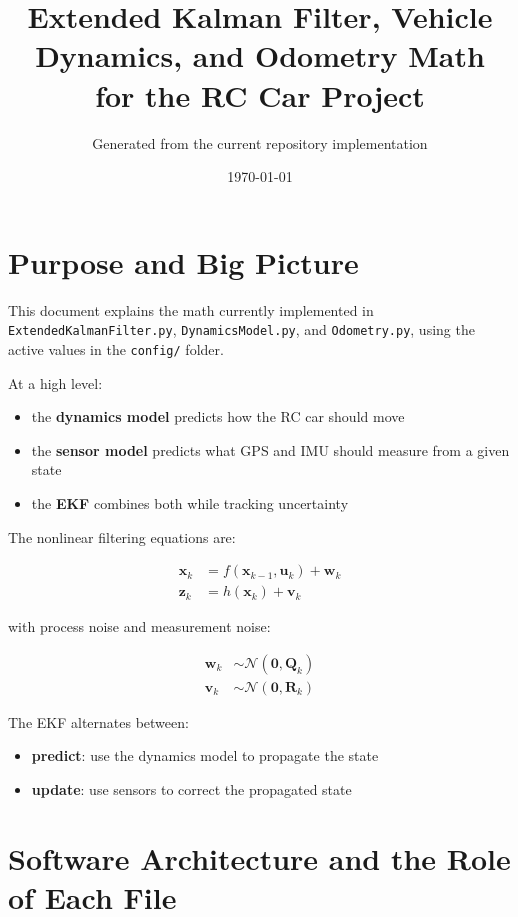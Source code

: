 \documentclass[11pt]{article}
\title{Extended Kalman Filter, Vehicle Dynamics, and Odometry Math\\for the RC Car Project}
\author{Generated from the current repository implementation}
\date{\today}
\newcommand{\vect}[1]{\boldsymbol{#1}}
\newcommand{\mat}[1]{\mathbf{#1}}
\begin{document}
\maketitle
\tableofcontents
\newpage

\section{Purpose and Big Picture}

This document explains the math currently implemented in \texttt{ExtendedKalmanFilter.py}, \texttt{DynamicsModel.py}, and \texttt{Odometry.py}, using the active values in the \texttt{config/} folder.

At a high level:

\begin{itemize}
    \item the \textbf{dynamics model} predicts how the RC car should move
    \item the \textbf{sensor model} predicts what GPS and IMU should measure from a given state
    \item the \textbf{EKF} combines both while tracking uncertainty
\end{itemize}

The nonlinear filtering equations are:

\begin{align}
\vect{x}_k &= f(\vect{x}_{k-1}, \vect{u}_k) + \vect{w}_k \\
\vect{z}_k &= h(\vect{x}_k) + \vect{v}_k
\end{align}

with process noise and measurement noise:

\begin{align}
\vect{w}_k &\sim \mathcal{N}(\vect{0}, \mat{Q}_k) \\
\vect{v}_k &\sim \mathcal{N}(\vect{0}, \mat{R}_k)
\end{align}

The EKF alternates between:

\begin{itemize}
    \item \textbf{predict}: use the dynamics model to propagate the state
    \item \textbf{update}: use sensors to correct the propagated state
\end{itemize}

\section{Software Architecture and the Role of Each File}
\end{document}
